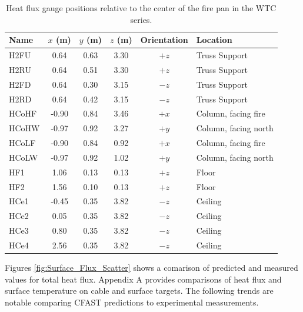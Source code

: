 \begin{table}[h!]
\caption{Heat flux gauge positions relative to the center of the fire pan in the WTC series.}
\begin{center}
\begin{tabular}{|l|c|c|c|c|l|}
\hline
Name    & $x$ (m)   & $y$ (m) & $z$ (m)   & Orientation  & Location  \\ \hline \hline
H2FU    & 0.64      & 0.63    & 3.30      &     $+z$     & Truss Support         \\ \hline
H2RU    & 0.64      & 0.51    & 3.30      &     $+z$     & Truss Support          \\ \hline
H2FD    & 0.64      & 0.30    & 3.15      &     $-z$     & Truss Support          \\ \hline
H2RD    & 0.64      & 0.42    & 3.15      &     $-z$     & Truss Support          \\ \hline
HCoHF   & -0.90     & 0.84    & 3.46      &     $+x$     & Column, facing fire          \\ \hline
HCoHW   & -0.97     & 0.92    & 3.27      &     $+y$     & Column, facing north          \\ \hline
HCoLF   & -0.90     & 0.84    & 0.92      &     $+x$     & Column, facing fire          \\ \hline
HCoLW   & -0.97     & 0.92    & 1.02      &     $+y$     & Column, facing north          \\ \hline
HF1     & 1.06      & 0.13    & 0.13      &     $+z$     & Floor          \\ \hline
HF2     & 1.56      & 0.10    & 0.13      &     $+z$     & Floor          \\ \hline
HCe1    & -0.45     & 0.35    & 3.82      &     $-z$     & Ceiling          \\ \hline
HCe2    &  0.05     & 0.35    & 3.82      &     $-z$     & Ceiling          \\ \hline
HCe3    &  0.80     & 0.35    & 3.82      &     $-z$     & Ceiling          \\ \hline
HCe4    &  2.56     & 0.35    & 3.82      &     $-z$     & Ceiling          \\ \hline
\end{tabular}
\end{center}
\label{WTC_Gauges}
\end{table}

Figures \ref{fig:Surface_Flux_Scatter} shows a comarison of predicted and measured values for total heat flux. Appendix A provides comparisons of heat flux and surface temperature on cable and surface targets.  The following trends are notable comparing CFAST predictions to experimental measurements.

